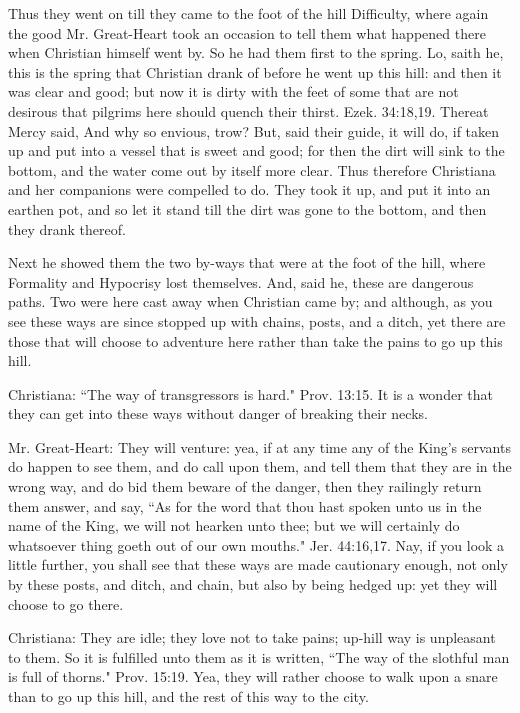 Thus they went on till they came to the foot of the hill Difficulty, where again the good Mr. Great-Heart took an occasion to tell them what happened there when Christian himself went by. So he had them first to the spring. Lo, saith he, this is the spring that Christian drank of before he went up this hill: and then it was clear and good; but now it is dirty with the feet of some that are not desirous that pilgrims here should quench their thirst. Ezek. 34:18,19. Thereat Mercy said, And why so envious, trow? But, said their guide, it will do, if taken up and put into a vessel that is sweet and good; for then the dirt will sink to the bottom, and the water come out by itself more clear. Thus therefore Christiana and her companions were compelled to do. They took it up, and put it into an earthen pot, and so let it stand till the dirt was gone to the bottom, and then they drank thereof.

Next he showed them the two by-ways that were at the foot of the hill, where Formality and Hypocrisy lost themselves. And, said he, these are dangerous paths. Two were here cast away when Christian came by; and although, as you see these ways are since stopped up with chains, posts, and a ditch, yet there are those that will choose to adventure here rather than take the pains to go up this hill.

Christiana: ``The way of transgressors is hard." Prov. 13:15. It is a wonder that they can get into these ways without danger of breaking their necks.

Mr. Great-Heart: They will venture: yea, if at any time any of the King's servants do happen to see them, and do call upon them, and tell them that they are in the wrong way, and do bid them beware of the danger, then they railingly return them answer, and say, ``As for the word that thou hast spoken unto us in the name of the King, we will not hearken unto thee; but we will certainly do whatsoever thing goeth out of our own mouths." Jer. 44:16,17. Nay, if you look a little further, you shall see that these ways are made cautionary enough, not only by these posts, and ditch, and chain, but also by being hedged up: yet they will choose to go there.

Christiana: They are idle; they love not to take pains; up-hill way is unpleasant to them. So it is fulfilled unto them as it is written, ``The way of the slothful man is full of thorns." Prov. 15:19. Yea, they will rather choose to walk upon a snare than to go up this hill, and the rest of this way to the city.

